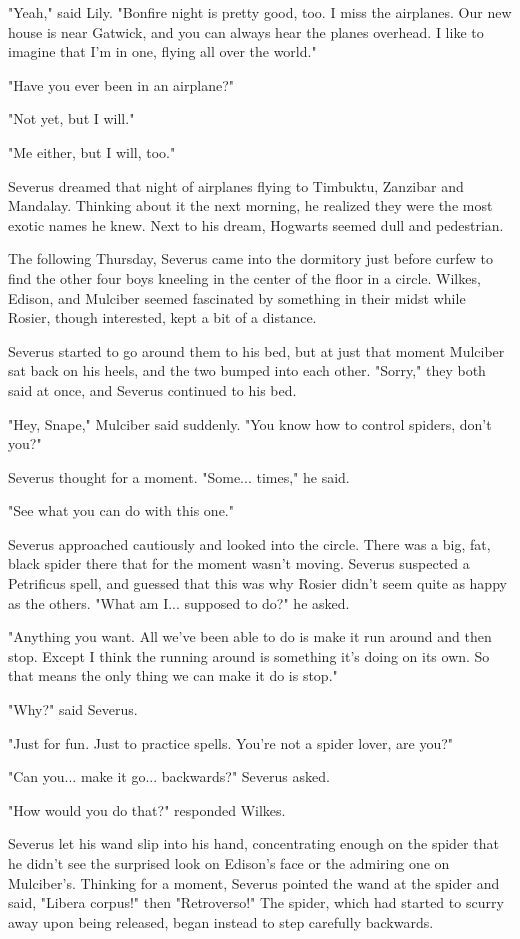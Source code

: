 \documentclass[a4paper,11pt]{article}
\begin{document}
"Yeah," said Lily. "Bonfire night is pretty good, too. I miss the airplanes. Our new house is near Gatwick, and you can always hear the planes overhead. I like to imagine that I'm in one, flying all over the world."

"Have you ever been in an airplane?"

"Not yet, but I will."

"Me either, but I will, too."

Severus dreamed that night of airplanes flying to Timbuktu, Zanzibar and Mandalay. Thinking about it the next morning, he realized they were the most exotic names he knew. Next to his dream, Hogwarts seemed dull and pedestrian.

The following Thursday, Severus came into the dormitory just before curfew to find the other four boys kneeling in the center of the floor in a circle. Wilkes, Edison, and Mulciber seemed fascinated by something in their midst while Rosier, though interested, kept a bit of a distance.

Severus started to go around them to his bed, but at just that moment Mulciber sat back on his heels, and the two bumped into each other. "Sorry," they both said at once, and Severus continued to his bed.

"Hey, Snape," Mulciber said suddenly. "You know how to control spiders, don't you?"

Severus thought for a moment. "Some... times," he said.

"See what you can do with this one."

Severus approached cautiously and looked into the circle. There was a big, fat, black spider there that for the moment wasn't moving. Severus suspected a Petrificus spell, and guessed that this was why Rosier didn't seem quite as happy as the others. "What am I... supposed to do?" he asked.

"Anything you want. All we've been able to do is make it run around and then stop. Except I think the running around is something it's doing on its own. So that means the only thing we can make it do is stop."

"Why?" said Severus.

"Just for fun. Just to practice spells. You're not a spider lover, are you?"

"Can you... make it go... backwards?" Severus asked.

"How would you do that?" responded Wilkes.

Severus let his wand slip into his hand, concentrating enough on the spider that he didn't see the surprised look on Edison's face or the admiring one on Mulciber's. Thinking for a moment, Severus pointed the wand at the spider and said, "Libera corpus!" then "Retroverso!" The spider, which had started to scurry away upon being released, began instead to step carefully backwards.
\end{document}
